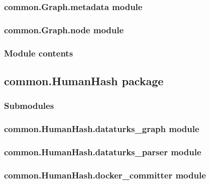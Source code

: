 \documentclass[letterpaper,10pt,english]{sphinxmanual}
\begin{document}
\subsubsection{common.Graph.metadata module}
\label{\detokenize{common.Graph:common-graph-metadata-module}}

\subsubsection{common.Graph.node module}
\label{\detokenize{common.Graph:common-graph-node-module}}

\subsubsection{Module contents}
\label{\detokenize{common.Graph:module-common.Graph}}\label{\detokenize{common.Graph:module-contents}}

\subsection{common.HumanHash package}
\label{\detokenize{common.HumanHash:common-humanhash-package}}\label{\detokenize{common.HumanHash::doc}}

\subsubsection{Submodules}
\label{\detokenize{common.HumanHash:submodules}}

\subsubsection{common.HumanHash.dataturks\_graph module}
\label{\detokenize{common.HumanHash:common-humanhash-dataturks-graph-module}}

\subsubsection{common.HumanHash.dataturks\_parser module}
\label{\detokenize{common.HumanHash:common-humanhash-dataturks-parser-module}}

\subsubsection{common.HumanHash.docker\_committer module}
\label{\detokenize{common.HumanHash:module-common.HumanHash.docker_committer}}\label{\detokenize{common.HumanHash:common-humanhash-docker-committer-module}}
\end{document}
